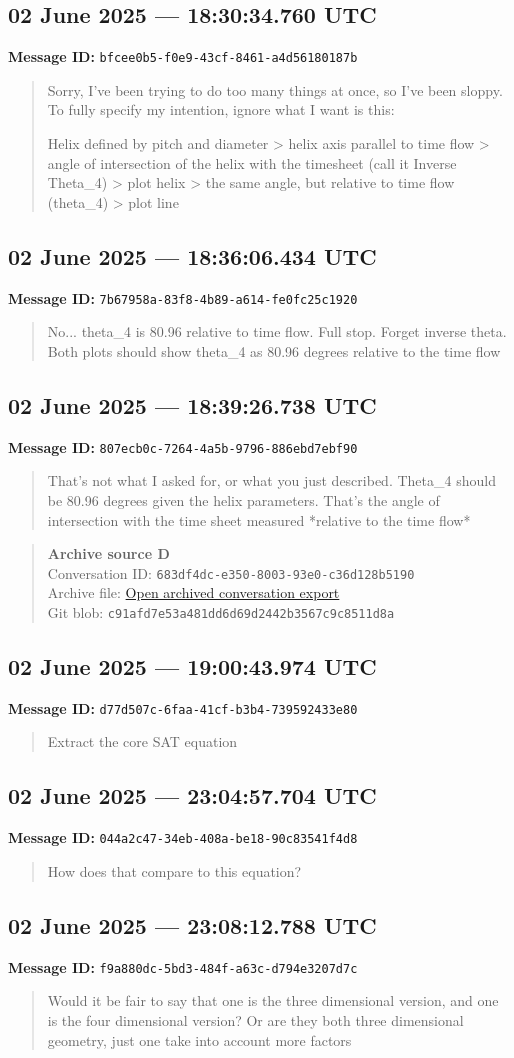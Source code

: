 \documentclass[11pt,letterpaper]{article}
\newcommand{\messageentry}[3]{%
  \Needspace{7\baselineskip}
  \subsection*{#1}
  {\small\textbf{Message ID:} \texttt{#2}}
  \vspace{2pt}
}
\newcommand{\sourceblock}[4]{%
  \begin{quote}\small
  \textbf{#1}\\
  Conversation ID: \texttt{#2}\\
  Archive file: \href{#3}{Open archived conversation export}\\
  Git blob: \texttt{#4}
  \end{quote}
}
\begin{document}
\messageentry{02 June 2025 --- 18:30:34.760 UTC}{bfcee0b5-f0e9-43cf-8461-a4d56180187b}{}
\begin{quote}\small
Sorry, I've been trying to do too many things at once, so I've been sloppy. To fully specify my intention, ignore what I want is this:\par Helix defined by pitch and diameter > helix axis parallel to time flow > angle of intersection of the helix with the timesheet (call it Inverse Theta\_4) > plot helix > the same angle, but relative to time flow (theta\_4) > plot line
\end{quote}

\messageentry{02 June 2025 --- 18:36:06.434 UTC}{7b67958a-83f8-4b89-a614-fe0fc25c1920}{}
\begin{quote}\small
No... theta\_4 is 80.96 relative to time flow. Full stop. Forget inverse theta. Both plots should show theta\_4 as 80.96 degrees relative to the time flow
\end{quote}

\messageentry{02 June 2025 --- 18:39:26.738 UTC}{807ecb0c-7264-4a5b-9796-886ebd7ebf90}{}
\begin{quote}\small
That's not what I asked for, or what you just described. Theta\_4 should be 80.96 degrees given the helix parameters. That's the angle of intersection with the time sheet measured *relative to the time flow*
\end{quote}

\sourceblock{Archive source D}{683df4dc-e350-8003-93e0-c36d128b5190}{https://github.com/Satobloc/HsH/blob/main/Core\%20SAT\%20Equation\%20Derivation\%20-\%20raw.json}{c91afd7e\hspace{0pt}53a481dd\hspace{0pt}6d69d244\hspace{0pt}2b3567c9\hspace{0pt}c8511d8a}

\messageentry{02 June 2025 --- 19:00:43.974 UTC}{d77d507c-6faa-41cf-b3b4-739592433e80}{}
\begin{quote}\small
Extract the core SAT equation
\end{quote}

\messageentry{02 June 2025 --- 23:04:57.704 UTC}{044a2c47-34eb-408a-be18-90c83541f4d8}{}
\begin{quote}\small
 How does that compare to this equation?
\end{quote}

\messageentry{02 June 2025 --- 23:08:12.788 UTC}{f9a880dc-5bd3-484f-a63c-d794e3207d7c}{}
\begin{quote}\small
Would it be fair to say that one is the three dimensional version, and one is the four dimensional version? Or are they both three dimensional geometry, just one take into account more factors
\end{quote}
\end{document}
